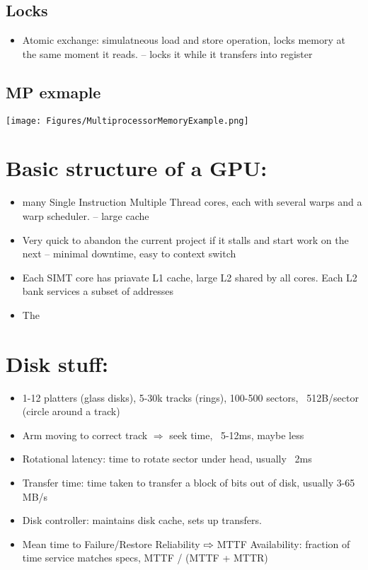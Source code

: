 \documentclass[letterpaper,landscape]{article}
\begin{document}
\begin{multicols}{2}
\subsection*{Locks}
\begin{itemize}
	\item Atomic exchange: simulatneous load and store operation, locks memory at the same moment it reads. -- locks it while it transfers into register
\end{itemize}
\subsection*{MP exmaple}
\begin{Figure}
	\centering
	\texttt{[image: Figures/MultiprocessorMemoryExample.png]}
\end{Figure}


\section{Basic structure of a GPU:}
\begin{itemize}
	\item many Single Instruction Multiple Thread cores, each with several warps and a warp scheduler. -- large cache
	\item Very quick to abandon the current project if it stalls and start work on the next -- minimal downtime, easy to context switch
	\item Each SIMT core has priavate L1 cache, large L2 shared by all cores. Each L2 bank services a subset of addresses
	\item The 
\end{itemize}


\section{Disk stuff:}
\begin{itemize}
	\item 1-12 platters (glass disks), 5-30k tracks (rings), 100-500 sectors, ~512B/sector (circle around a track)
	\item Arm moving to correct track $\Rightarrow$ seek time, ~5-12ms, maybe less
	\item Rotational latency: time to rotate sector under head, usually ~2ms
	\item Transfer time: time taken to transfer a block of bits out of disk, usually 3-65 MB/s
	\item Disk controller: maintains disk cache, sets up transfers.
	\item Mean time to Failure/Restore
	\subitem Reliability $\rightwhitearrow$ MTTF
	\subitem Availability: fraction of time service matches specs, MTTF / (MTTF + MTTR)
\end{itemize}



\end{multicols}
\end{document}

